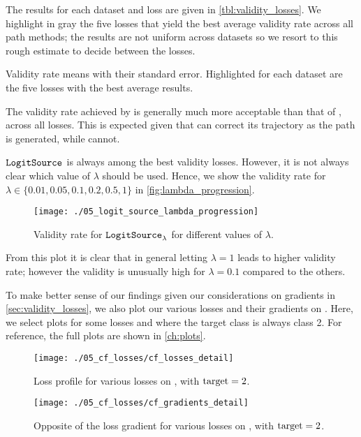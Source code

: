 \documentclass[../main.tex]{subfiles}
\begin{document}
The results for each dataset and loss are given in \autoref{tbl:validity_losses}.
We highlight in gray the five losses that yield the best average validity rate across all path methods; the results are not uniform across datasets so we resort to this rough estimate to decide between the losses.

\begin{table}[h!]
\centering

\caption{Validity rate means with their standard error. Highlighted for each dataset are the five losses with the best average results.}
\label{tbl:validity_losses}
\end{table}

The validity rate achieved by \revise{} is generally much more acceptable than that of \ls{}, across all losses.
This is expected given that \revise{} can correct its trajectory as the path is generated, while \ls{} cannot.

$\mathtt{LogitSource}_{}$ is always among the best validity losses.
However, it is not always clear which value of $\lambda$ should be used.
Hence, we show the validity rate for $\lambda \in \{ 0.01, 0.05, 0.1, 0.2, 0.5, 1\}$ in \autoref{fig:lambda_progression}.

\begin{figure}[htbp]
    \centering
\texttt{[image: ./05\_logit\_source\_lambda\_progression]}

    \caption{Validity rate for $\mathtt{LogitSource}_{\lambda}$ for different values of $\lambda$.}
    \label{fig:lambda_progression}
\end{figure}

From this plot it is clear that in general letting $\lambda = 1$ leads to higher validity rate;
however the validity is unusually high for $\lambda = 0.1$ compared to the others.

To make better sense of our findings given our considerations on gradients in \autoref{sec:validity_losses},
we also plot our various losses and their gradients on \CakeOnSea.
Here, we select plots for some losses and where the target class is always class 2.
For reference, the full plots are shown in \autoref{ch:plots}.


\begin{figure}[htbp]
    \centering
\texttt{[image: ./05\_cf\_losses/cf\_losses\_detail]}
    \caption{Loss profile for various losses on \CakeOnSea, with ${\mathrm{target} = 2}$.}
    \label{fig:cf_losses_detail}

    \vspace*{\floatsep}%

\texttt{[image: ./05\_cf\_losses/cf\_gradients\_detail]}
    \caption{Opposite of the loss gradient for various losses on \CakeOnSea, with $\mathrm{target} = 2$.}
    \label{fig:cf_gradients_detail}
\end{figure}
\end{document}
